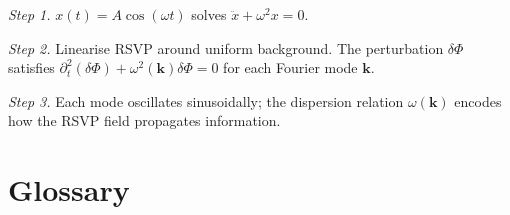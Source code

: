 \documentclass[11pt, openany]{book}
\theoremstyle{plain}
\theoremstyle{definition}
\theoremstyle{remark}
\begin{document}
\textit{Step 1.} $x(t)=A\cos(\omega t)$ solves $\ddot{x}+\omega^2x=0$.

\textit{Step 2.} Linearise RSVP around uniform background. The perturbation
$\delta\Phi$ satisfies $\partial_t^2(\delta\Phi)+\omega^2(\mathbf{k})\delta\Phi=0$
for each Fourier mode $\mathbf{k}$.

\textit{Step 3.} Each mode oscillates sinusoidally; the dispersion relation
$\omega(\mathbf{k})$ encodes how the RSVP field propagates information.

\backmatter

\chapter*{Glossary}
\end{document}
